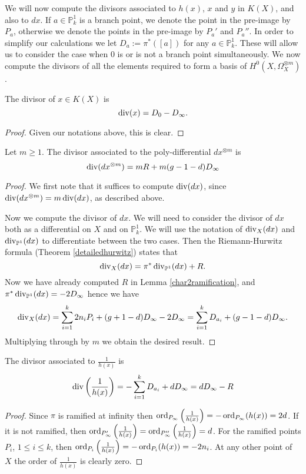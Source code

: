 We will now compute the divisors associated to $h(x)$, $x$ and $y$ in $K(X)$, and also to $dx$.
If $a\in \mathbb P_k^1$ is a branch point, we denote the point in the pre-image by $P_a$, otherwise we denote the points in the pre-image by $P_a'$ and $P_a''$.
In order to simplify our calculations we let $D_a := \pi^*([a])$ for any $a\in \mathbb P_k^1$.
These will allow us to consider the case when 0 is or is not a branch point simultaneously. 
We now compute the divisors of all the elements required to form a basis of $H^0(X,\Omega_X^{\otimes m})$.

    \begin{lem}\label{xchar2}
    The divisor of $x\in K(X)$ is 
        \[
        \operatorname{div} (x)= D_0 - D_\infty.
        \]
    \end{lem}
    \begin{proof}
    Given our notations above, this is clear.
    \end{proof}


    \begin{lem}\label{dxchar2}
    Let $m\geq 1$.
    The divisor associated to the poly-differential $dx^{\otimes m}$ is 
        \[
        \operatorname{div} (dx^{\otimes m}) =mR + m(g-1-d)D_\infty
        \]
    \end{lem}
    \begin{proof}
    We first note that it suffices to compute $\operatorname{div} (dx)$, since $\operatorname{div} (dx^{\otimes m}) = m\operatorname{div} (dx)$, as described above.
    
    Now we compute the divisor of $dx$.
    We will need to consider the divisor of $dx$ both as a differential on $X$ and on $\mathbb P_k^1$. 
    We will use the notation of $\operatorname{div}_X(dx)$ and $\operatorname{div}_{\mathbb P^1}(dx)$ to differentiate between the two cases.
    Then the Riemann-Hurwitz formula (Theorem \ref{detailedhurwitz}) states that
        \[
        \operatorname{div}_X( dx) = \pi^*\operatorname{div}_{\mathbb P^1}(dx) + R.
        \]
    Now we have already computed $R$ in Lemma \ref{char2ramification}, and $\pi^*\operatorname{div}_{\mathbb P^1}(dx) = -2D_\infty$ hence we have
        \[
        \operatorname{div}_X( dx) = \sum_{i=1}^k 2n_iP_i + (g+1-d)D_\infty - 2D_\infty = \sum_{i=1}^k D_{a_i} + (g-1-d)D_\infty.
        \]
    Multiplying through by $m$ we obtain the desired result.
    \end{proof}



    \begin{lem}\label{h(x)char2}
    The divisor associated to $\frac{1}{h(x)}$ is
        \[
        \operatorname{div} \left(\frac{1}{h(x)}\right) = - \sum_{i=1}^k D_{a_i} + dD_\infty = dD_\infty - R
        \]
    \end{lem}
    \begin{proof}
    Since $\pi$ is ramified at infinity then $\operatorname{ord}_{P_{\infty}}\left(\frac{1}{h(x)}\right) = -\operatorname{ord}_{P_{\infty}}(h(x)) = 2d$.
    If it is not ramified, then $\operatorname{ord}_{P_{\infty}'}\left(\frac{1}{h(x)}\right) = \operatorname{ord}_{P_{\infty}''}\left(\frac{1}{h(x)}\right)=d$.
    For the ramified points $P_i$, $1\leq i \leq k$, then $\operatorname{ord}_{P_i}\left(\frac{1}{h(x)}\right) = -\operatorname{ord}_{P_i}(h(x))= -2n_i$.
    At any other point of $X$ the order of $\frac{1}{h(x)}$ is clearly zero.
    \end{proof}

